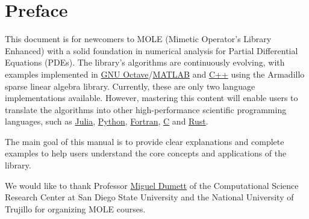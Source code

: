 \chapter{Preface}

This document is for newcomers to MOLE (Mimetic Operator's
Library Enhanced) with a solid foundation in numerical analysis for
Partial Differential Equations (PDEs).
The library's algorithms are continuously evolving, with examples
implemented in
\href{https://octave.org}{GNU Octave}/\href{https://www.mathworks.com/products/matlab.html}{MATLAB}
and \href{https://isocpp.org}{C++} using the Armadillo sparse linear
algebra library.
Currently, these are only two language implementations available.
However, mastering this content will enable users to translate the
algorithms into other high-performance
scientific programming languages, such as
\href{https://julialang.org}{Julia},
\href{https://www.python.org}{Python},
\href{https://fortran-lang.org}{Fortran},
\href{https://www.open-std.org/jtc1/sc22/wg14}{C} and
\href{https://www.rust-lang.org}{Rust}.

The main goal of this manual is to provide clear explanations and
complete examples to help users understand the core
concepts and applications of the library.

We would like to thank Professor
\href{https://ctivitae.concytec.gob.pe/appDirectorioCTI/VerDatosInvestigador.do?id_investigador=45848}{Miguel Dumett}
of the Computational Science Research Center at San Diego State
University and the National University of Trujillo for organizing
MOLE courses.

